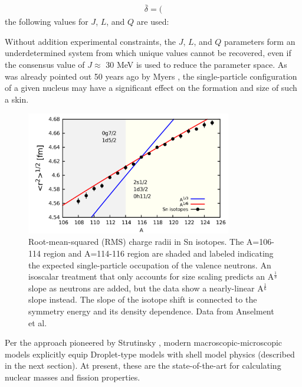     \begin{equation*}
        \begin{split}
            \bar{\delta} = (
        \end{split}
    \end{equation*}
    the following values for $J$, $L$,
    and $Q$ are used:

Without addition experimental constraints, the $J$, $L$, and $Q$ parameters form an
underdetermined system from which unique values cannot be recovered, even if the
consensus value of $J \approx$ 30 MeV is used to reduce the parameter space.
As was already pointed out 50 years ago by Myers \cite{Myers1969},
the single-particle configuration of a given nucleus may have a significant
effect on the formation and size of such a skin.

\begin{figure}
    \centering
    \includegraphics[width=0.8\textwidth]{figures/SnIsotopeRMSRadii.png}
    \caption[Root-mean-squared charge radii of Sn isotopes]
    {
        Root-mean-squared (RMS) charge radii in Sn isotopes.
        The A=106-114 region and A=114-116 region are shaded and labeled
    indicating the expected single-particle occupation of the valence neutrons.
    An isoscalar treatment that only accounts for size scaling predicts an
    A$^{\frac{1}{3}}$ slope as neutrons are added, but the data show a nearly-linear
A$^{\frac{1}{6}}$ slope instead. The slope of the isotope shift is connected to the symmetry energy
and its density dependence. Data from Anselment et al. \cite{Anselment1986}}
    \label{SnIsotopeShift}
\end{figure}

Per the approach pioneered by Strutinsky \cite{Strutinsky1967, Seeger1975},
modern macroscopic-microscopic models \cite{Moller1988, Wang2015} explicitly equip Droplet-type models
with shell model physics (described in the next section). At present, these are the state-of-the-art
for calculating nuclear masses and fission properties.

